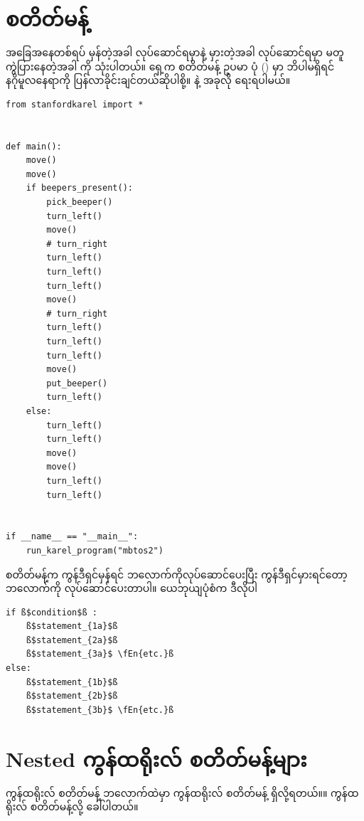 \section{ စတိတ်မန့်}
အခြေအနေတစ်ရပ် မှန်တဲ့အခါ လုပ်ဆောင်ရမှာနဲ့ မှားတဲ့အခါ လုပ်ဆောင်ရမှာ မတူကွဲပြားနေတဲ့အခါ  ကို သုံးပါတယ်။ ရှေ့က  စတိတ်မန့် ဥပမာ ပုံ (\fRefNo{\ref{fig:mbtos_if_any}})  မှာ ဘိပါမရှိရင် နဂိုမူလနေရာကို ပြန်လာခိုင်းချင်တယ်ဆိုပါစို့။  နဲ့ အခုလို ရေးရပါမယ်။
%
\setlength{\fboxsep}{0pt}
\begin{verbatim}
from stanfordkarel import *


def main():
    move()
    move()
    if beepers_present():
        pick_beeper()
        turn_left()
        move()
        # turn_right
        turn_left()
        turn_left()
        turn_left()
        move()
        # turn_right
        turn_left()
        turn_left()
        turn_left()
        move()
        put_beeper()
        turn_left()
    else:
        turn_left()
        turn_left()
        move()
        move()
        turn_left()
        turn_left()


if __name__ == "__main__":
    run_karel_program("mbtos2")
\end{verbatim}
%

 စတိတ်မန့်က ကွန်ဒီရှင်မှန်ရင်   ဘလောက်ကိုလုပ်ဆောင်ပေးပြီး ကွန်ဒီရှင်မှားရင်တော့  ဘလောက်ကို လုပ်ဆောင်ပေးတာပါ။ ယေဘုယျပုံစံက ဒီလိုပါ
%
\setlength{\fboxsep}{0pt}
\begin{verbatim}
if ß$condition$ß :
    ß$statement_{1a}$ß
    ß$statement_{2a}$ß
    ß$statement_{3a}$ \fEn{etc.}ß
else:
    ß$statement_{1b}$ß
    ß$statement_{2b}$ß
    ß$statement_{3b}$ \fEn{etc.}ß
\end{verbatim}
%

\section{Nested ကွန်ထရိုးလ် စတိတ်မန့်များ}
ကွန်ထရိုးလ် စတိတ်မန့် ဘလောက်ထဲမှာ ကွန်ထရိုးလ် စတိတ်မန့် ရှိလို့ရတယ်။။  ကွန်ထရိုးလ် စတိတ်မန့်လို့ ခေါ်ပါတယ်။ 

